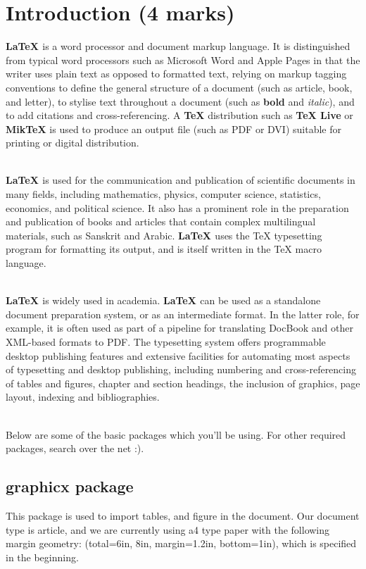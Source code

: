 \documentclass[12pt]{article}
\begin{document}
\section{Introduction (4 marks)}
\textbf{\LaTeX{ }} is a word processor and document markup language. It is distinguished
from typical word processors such as Microsoft Word and Apple Pages in that
the writer uses plain text as opposed to formatted text, relying on markup
tagging conventions to define the general structure of a document (such as
article, book, and letter), to stylise text throughout a document (such as \textbf{bold}
and \textit{italic}), and to add citations and cross-referencing. A \textbf{\TeX} distribution such
as \textbf{\TeX{ } Live} or \textbf{MikTeX} is used to produce an output file (such as PDF or DVI)
suitable for printing or digital distribution.\par\mbox{}\\
\textbf{\LaTeX{ }} is used for the communication and publication of scientific documents
in many fields, including mathematics, physics, computer science, statistics,
economics, and political science. It also has a prominent role in the preparation
and publication of books and articles that contain complex multilingual materials, such as Sanskrit and Arabic. \textbf{\LaTeX{ }} uses the TeX typesetting program for
formatting its output, and is itself written in the TeX macro language.\par\mbox{}\\
\textbf{\LaTeX{ }} is widely used in academia. \textbf{\LaTeX{ }} can be used as a standalone document preparation system, or as an intermediate format. In the latter role, for
example, it is often used as part of a pipeline for translating DocBook and other
XML-based formats to PDF. The typesetting system offers programmable desktop publishing features and extensive facilities for automating most aspects of
typesetting and desktop publishing, including numbering and cross-referencing
of tables and figures, chapter and section headings, the inclusion of graphics,
page layout, indexing and bibliographies.\par\mbox{}\\
Below are some of the basic packages which you’ll be using. For other
required packages, search over the net :).
\subsection{graphicx package}
This package is used to import tables, and figure in the document. Our
document type is article, and we are currently using a4 type paper with the
following margin geometry: (total={6in, 8in}, margin=1.2in, bottom=1in),
which is specified in the beginning.
\end{document}
